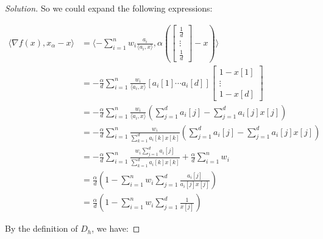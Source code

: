 \documentclass{article}
\newenvironment{solution}
  {\renewcommand\qedsymbol{$\blacksquare$}\begin{proof}[Solution]}
  {\end{proof}}
\begin{document}
\begin{solution}
So we could expand the following expressions:

\begin{align*}
    \langle \nabla f(x), x_\alpha - x \rangle
    &= \langle -\sum_{i=1}^n w_i \frac{a_i}{\langle a_i, x \rangle}, \alpha \left( \begin{bmatrix}
    \frac{1}{d} \\
    \vdots \\
    \frac{1}{d} \end{bmatrix} - x \right) \rangle \\
    &= - \frac{\alpha}{d} \sum_{i = 1}^n \frac{w_i}{\langle a_i, x \rangle} 
        \left[a_i[1] \cdots a_i[d]\right]
        \begin{bmatrix}
        1 - x[1] \\
        \vdots \\
        1 - x[d]
        \end{bmatrix} \\
    &= - \frac{\alpha}{d} \sum_{i = 1}^n \frac{w_i}{\langle a_i, x \rangle} \left( \sum_{j = 1}^d a_i[j] - \sum_{j = 1}^d a_i[j] x[j] \right) \\
    &= - \frac{\alpha}{d} \sum_{i = 1}^n \frac{w_i}{\sum_{k = 1}^d a_i[k] x[k]} \left( \sum_{j = 1}^d a_i[j] - \sum_{j = 1}^d a_i[j] x[j] \right) \\
    &= - \frac{\alpha}{d} \sum_{i = 1}^n \frac{w_i \sum_{j = 1}^d a_i[j]}{\sum_{k = 1}^d a_i[k] x[k]} + \frac{\alpha}{d} \sum_{i = 1}^n w_i \\
    &= \frac{\alpha}{d} \left( 1 - \sum_{i = 1}^n w_i \sum_{j = 1}^d \frac{a_i[j]}{a_i[j] x[j]} \right) \\
    &= \frac{\alpha}{d} \left( 1 - \sum_{i = 1}^n w_i \sum_{j = 1}^d \frac{1}{x[j]} \right)
    \tag{1}
\end{align*}

By the definition of $D_h$, we have:


\end{solution}
\end{document}
